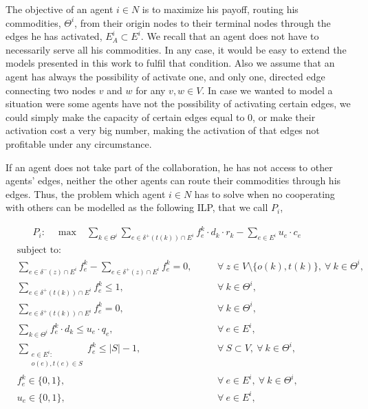 \documentclass{article}
\begin{document}
The objective of an agent $i \in N$ is to maximize his payoff, routing his
commodities, $\Theta^i$, from their origin nodes to their terminal nodes through the edges he has activated,  $E_A^i\subset E^i$. We recall that an agent does not have to necessarily serve all his commodities. In any case, it would be easy to extend the models presented in this work to fulfil that condition. Also we assume that an agent has always the possibility of activate one, and only one, directed edge connecting two nodes $v$ and $w$ for any $v,w\in V$. In case we wanted to model a situation were some agents have not the possibility of activating certain edges, we could simply make the capacity of certain edges equal to 0, or make their activation cost a very big number, making the activation of that edges not profitable under any circumstance.

If an agent does not take part of the collaboration, he has not access to other agents' edges, neither the other agents can route their commodities through his edges. Thus, the problem which agent $i\in N$ has to solve when no cooperating with others can be modelled as the following ILP, that we call $P_i$,

    \begin{align}
        &  P_i: \quad \max  &  \sum_{k\in \Theta^i} \sum_{e \in \delta^+(t(k))\cap E^i} f_e^k \cdot d_k \cdot r_k - \sum_{e\in E^i} u_e\cdot c_e \hspace{20pt} &&   \label{eq:SingleAgentA}
    \end{align}
    \begin{align}
        & \text{subject to:}       &  \nonumber\\
       & \sum_{e \in \delta^-(z)\cap E^i} f_e^k-\sum_{e \in \delta^+(z)\cap E^i} f_e^k = 0,\quad && \forall\ z\in V\setminus\{o(k),t(k)\},\ \forall\ k\in\Theta^i,  \label{eq:SingleAgentB}\\
        &    \sum_{e \in \delta^+(t(k))\cap E^i} f_e^k \leq 1,  && \forall\ k\in \Theta^i, \label{eq:SingleAgentC} \\
		& \sum_{e \in \delta^+(t(k))\cap E^i} f_e^k= 0,  && \forall\ k\in \Theta^i, \label{eq:SingleAgentD} \\
		& \sum_{k \in \Theta^i} f_e^k \cdot d_k \leq u_e\cdot q_e, && \forall\ e \in E^i,\label{eq:SingleAgentE}  \\
		& \sum_{\substack{e \in E^i\colon \\ o(e),t(e) \in S}} f_e^k \leq |S| -1,   && \forall\ S \subset V,\ \forall\ k \in \Theta^i, \label{eq:SingleAgentF}\\[1em]
		& f_e^k \in \{0,1\},    && \forall\ e \in E^i,\ \forall\ k \in \Theta^i, \label{eq:SingleAgentG} \\ 
		&  u_e   \in \{0,1\},           && \forall\ e \in E^i,
    \end{align}
\end{document}
